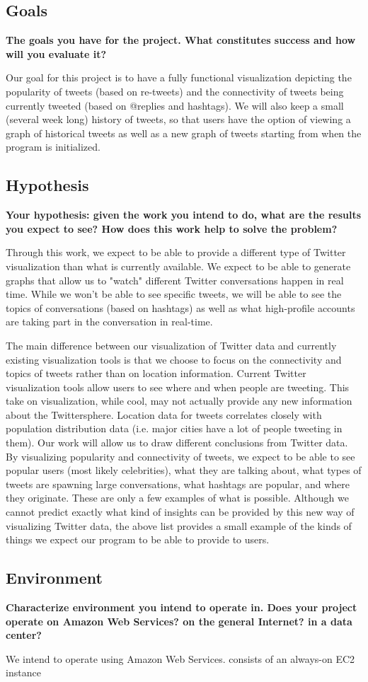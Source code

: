 \subsection{Goals}
\textbf{The goals you have for the project. What constitutes success and how will you evaluate it?}

Our goal for this project is to have a fully functional visualization depicting the popularity of tweets (based on
re-tweets) and the connectivity of tweets being currently tweeted (based on @replies and hashtags). We will also keep a
small (several week long) history of tweets, so that users have the option of viewing a graph of historical tweets as
well as a new graph of tweets starting from when the program is initialized.

\subsection{Hypothesis}
\textbf{Your hypothesis: given the work you intend to do, what are the results you expect to see? How does this work help to solve the problem?}

Through this work, we expect to be able to provide a different type of Twitter visualization than what is currently available.
We expect to be able to generate graphs that allow us to "watch" different Twitter conversations happen in real time. While
we won't be able to see specific tweets, we will be able to see the topics of conversations (based on hashtags) as well as
what high-profile accounts are taking part in the conversation in real-time.

The main difference between our visualization of Twitter data and currently existing visualization tools is that we choose
to focus on the connectivity and topics of tweets rather than on location information. Current Twitter visualization tools
allow users to see where and when people are tweeting. This take on visualization, while cool, may not actually provide
any new information about the Twittersphere. Location data for tweets correlates closely with population distribution data (i.e.
major cities have a lot of people tweeting in them). Our work will allow us to draw different conclusions from Twitter
data. By visualizing popularity and connectivity of tweets, we expect to be able to see popular users (most likely
celebrities), what they are talking about, what types of tweets are spawning large conversations, what hashtags are
popular, and where they originate. These are only a few examples of what is possible. Although we cannot predict exactly
what kind of insights can be provided by this new way of visualizing Twitter data, the above list provides a small example
of the kinds of things we expect our program to be able to provide to users.

\subsection{Environment}
\textbf{Characterize environment you intend to operate in. Does your project operate on Amazon Web Services? on the general Internet? in a data center?}

We intend to operate using Amazon Web Services. \sys consists of an always-on EC2 instance
